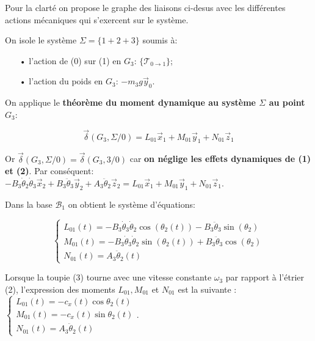 \begin{corrige}
Pour la clarté on propose le graphe des liaisons ci-desus avec les différentes actions mécaniques qui s'exercent sur le système.


On isole le système $\Sigma = \{ 1+2+3 \}$ soumis à:
\begin{itemize}
\item[•] l'action de (0) sur (1) en $G_3$: $\{\mathcal{T}_{0 \to 1}\}$;
\item[•] l'action du poids en $G_3$: $-m_3 g \overrightarrow{y}_0$.
\end{itemize}

On applique le \textbf{théorème du moment dynamique au système $\Sigma$ au point $G_3$}:

$$ \boxed{\overrightarrow{\delta}(G_3,\Sigma/0) = L_{01}\overrightarrow{x}_1 + M_{01}\overrightarrow{y}_1 + N_{01}\overrightarrow{z}_1} $$

Or $\overrightarrow{\delta}(G_3,\Sigma/0) = \overrightarrow{\delta}(G_3,3/0)$ car \textbf{on néglige les effets dynamiques de (1) et (2)}. Par conséquent:
$ -B_3\dot{\theta}_2\dot{\theta}_3\overrightarrow{x}_2 + B_3 \ddot{\theta}_3\overrightarrow{y}_2 + A_3\ddot{\theta}_{2}\overrightarrow{z}_2 = L_{01}\overrightarrow{x}_1 + M_{01}\overrightarrow{y}_1 + N_{01}\overrightarrow{z}_1$.

Dans la base $\mathcal{B}_1$ on obtient le système d'équations:

$$
\left\{
\begin{array}{ll}
L_{01}(t) = - B_3 \dot{\theta}_3\dot{\theta}_2 \cos(\theta_2(t)) - B_3 \ddot{\theta}_3 \sin(\theta_2)  \\
M_{01}(t) = - B_3 \dot{\theta}_3\dot{\theta}_2 \sin(\theta_2(t)) + B_3 \ddot{\theta}_3 \cos(\theta_2) \\
N_{01}(t) = A_3 \ddot{\theta}_2(t)
\end{array}
\right.
$$
 
\end{corrige}
\else
\fi

\ifprof
\else
Lorsque la toupie (3) tourne avec une vitesse constante $\omega_{3}$ par rapport à l'étrier (2), l'expression des moments $L_{01}, M_{01}$ et $N_{01}$ est la suivante :
$
\left\{\begin{array}{l}
L_{01}(t)=-c_{x}(t) \cos \theta_{2}(t) \\
M_{01}(t)=-c_{x}(t) \sin \theta_{2}(t) \\
N_{01}(t)=A_{3} \ddot{\theta}_{2}(t)
\end{array}\right.
$.

